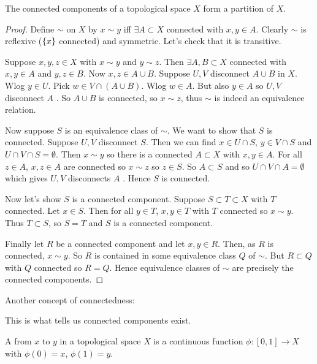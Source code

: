\begin{theorem} \label{thm:45}
    The connected components of a topological space $X$ form a partition of $X$.
\end{theorem}

\begin{proof}
    Define $\sim$ on $X$ by $x\sim y$ iff $\exists A\subset X$ connected with $x,y \in A$.
    Clearly $\sim$ is reflexive ($\{x\}$ connected) and symmetric.
    Let's check that it is transitive.

    Suppose $x,y,z\in X$ with $x\sim y$ and $y\sim z$.
    Then $\exists A,B\subset X$ connected with $x,y\in A$ and $y,z\in B$. Now $x,z\in A\cup B$. Suppose $U,V$ disconnect $A\cup B$ in $X$.
    Wlog $y\in U$. Pick $w\in V\cap(A\cup B)$.
    Wlog $w\in A$. But also $y\in A$ so $U,V$ disconnect $A$ \Lightning.
    So $A\cup B$ is connected, so $x\sim z$, thus $\sim$ is indeed an equivalence relation.

    Now suppose $S$ is an equivalence class of $\sim$.
    We want to show that $S$ is connected.
    Suppose $U,V$ disconnect $S$. Then we can find $x\in U\cap S$, $y\in V\cap S$ and $U\cap V\cap S = \emptyset$.
    Then $x\sim y$ so there is a connected $A\subset X$ with $x,y\in A$.
    For all $z\in A$, $x,z\in A$ are connected so $x\sim z$ so $z\in S$.
    So $A\subset S$ and so $U\cap V\cap A = \emptyset$ which gives $U,V$ disconnects $A$ \Lightning.
    Hence $S$ is connected.

    Now let's show $S$ is a connected component. Suppose $S\subset T\subset X$ with $T$ connected.
    Let $x\in S$. Then for all $y\in T$, $x,y\in T$ with $T$ connected so $x\sim y$.
    Thus $T\subset S$, so $S=T$ and $S$ is a connected component.

    Finally let $R$ be a connected component and let $x,y\in R$. Then, as $R$ is connected, $x \sim y$.
    So $R$ is contained in some equivalence class $Q$ of $\sim$.
    But $R\subset Q$ with $Q$ connected so $R=Q$. Hence equivalence classes of $\sim$ are precisely the connected components.
\end{proof}

Another concept of connectedness:
\begin{remark}
    This is what tells us connected components exist.
\end{remark}

\begin{definition}[Paths]
    A  from $x$ to $y$ in a topological space $X$ is a continuous function $\phi:[0,1]\to X$ with $\phi(0) = x$, $\phi(1) = y$.
\end{definition}

